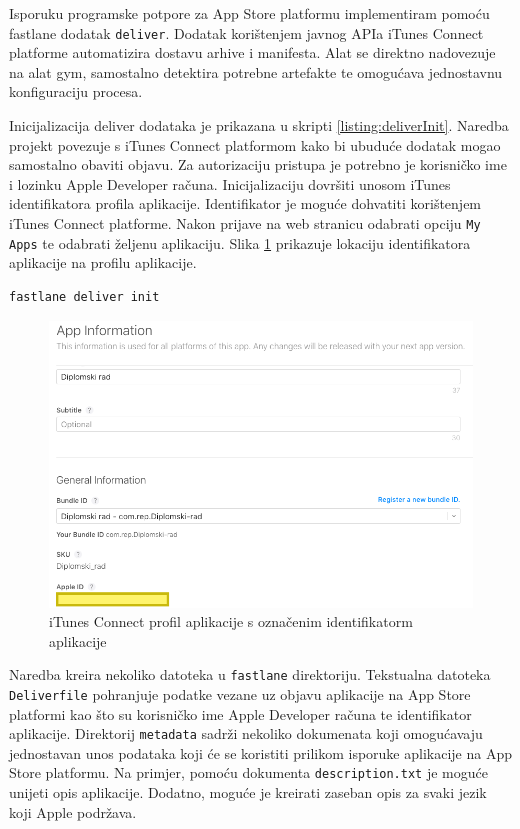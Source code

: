 \documentclass[times, utf8, diplomski, numeric]{fer}
\begin{document}
Isporuku programske potpore za App Store platformu implementiram pomoću fastlane dodatak \verb|deliver|\citep{fastlane:deliver}. Dodatak korištenjem javnog APIa iTunes Connect platforme automatizira dostavu arhive i manifesta. Alat se direktno nadovezuje na alat gym, samostalno detektira potrebne artefakte te omogućava jednostavnu konfiguraciju procesa.

Inicijalizacija deliver dodataka je prikazana u skripti \ref{listing:deliverInit}. Naredba projekt povezuje s iTunes Connect platformom kako bi ubuduće dodatak mogao samostalno obaviti objavu. Za autorizaciju pristupa je potrebno je korisničko ime i lozinku Apple Developer računa. Inicijalizaciju dovršiti unosom iTunes identifikatora profila aplikacije. Identifikator je moguće dohvatiti korištenjem iTunes Connect platforme. Nakon prijave na web stranicu  odabrati opciju \verb|My Apps| te odabrati željenu aplikaciju. Slika \ref{fig:iTunesConnectAppId} prikazuje lokaciju identifikatora aplikacije na profilu aplikacije.

\begin{lstlisting}[caption=Inicijalizacija deliver dodatka, label=listing:deliverInit]
fastlane deliver init
\end{lstlisting}

\begin{figure}
\centering
\includegraphics[scale=0.45]{iTunesConnectAppId}
\caption{iTunes Connect profil aplikacije s označenim identifikatorm aplikacije}
\label{fig:iTunesConnectAppId}
\end{figure}

Naredba kreira nekoliko datoteka u \verb|fastlane| direktoriju. Tekstualna datoteka \verb|Deliverfile| pohranjuje podatke vezane uz objavu aplikacije na App Store platformi kao što su korisničko ime Apple Developer računa te identifikator aplikacije. Direktorij \verb|metadata| sadrži nekoliko dokumenata koji omogućavaju jednostavan unos podataka koji će se koristiti prilikom isporuke aplikacije na App Store platformu. Na primjer, pomoću dokumenta \verb|description.txt| je moguće unijeti opis aplikacije. Dodatno, moguće je kreirati zaseban opis za svaki jezik koji Apple podržava.
\end{document}

